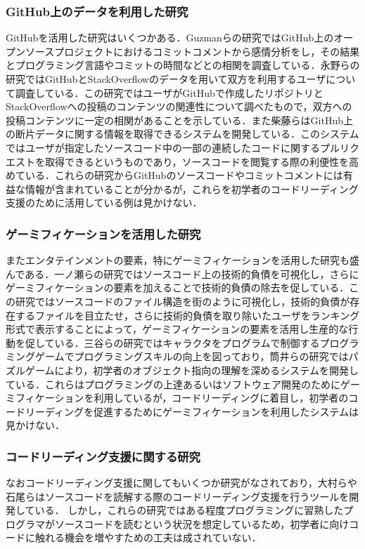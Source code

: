 \subsubsection{GitHub上のデータを利用した研究}
GitHubを活用した研究はいくつかある．Guzmanらの研究ではGitHub上のオープンソースプロジェクトにおけるコミットコメントから感情分析をし，その結果とプログラミング言語やコミットの時間などとの相関を調査している\cite{guzman}．永野らの研究ではGitHubとStackOverflowのデータを用いて双方を利用するユーザについて調査している\cite{nagano}．この研究ではユーザがGitHubで作成したリポジトリとStackOverflowへの投稿のコンテンツの関連性について調べたもので，双方への投稿コンテンツに一定の相関があることを示している．また柴藤らはGitHub上の断片データに関する情報を取得できるシステムを開発している\cite{shibatou}．このシステムではユーザが指定したソースコード中の一部の連続したコードに関するプルリクエストを取得できるというものであり，ソースコードを閲覧する際の利便性を高めている．これらの研究からGitHubのソースコードやコミットコメントには有益な情報が含まれていることが分かるが，これらを初学者のコードリーディング支援のために活用している例は見かけない．

\subsubsection{ゲーミフィケーションを活用した研究}
またエンタテインメントの要素，特にゲーミフィケーションを活用した研究も盛んである．一ノ瀬らの研究\cite{ichinose}ではソースコード上の技術的負債を可視化し，さらにゲーミフィケーションの要素を加えることで技術的負債の除去を促している．この研究ではソースコードのファイル構造を街のように可視化し，技術的負債が存在するファイルを目立たせ，さらに技術的負債を取り除いたユーザをランキング形式で表示することによって，ゲーミフィケーションの要素を活用し生産的な行動を促している．三谷らの研究\cite{mitani}ではキャラクタをプログラムで制御するプログラミングゲームでプログラミングスキルの向上を図っており，筒井らの研究\cite{tsutsui}ではパズルゲームにより，初学者のオブジェクト指向の理解を深めるシステムを開発している．これらはプログラミングの上達あるいはソフトウェア開発のためにゲーミフィケーションを利用しているが，コードリーディングに着目し，初学者のコードリーディングを促進するためにゲーミフィケーションを利用したシステムは見かけない．

\subsubsection{コードリーディング支援に関する研究}
なおコードリーディング支援に関してもいくつか研究がなされており，大村らや石尾らはソースコードを読解する際のコードリーディング支援を行うツールを開発している\cite{omura}\cite{ishio}．
しかし，これらの研究ではある程度プログラミングに習熟したプログラマがソースコードを読むという状況を想定しているため，初学者に向けコードに触れる機会を増やすための工夫は成されていない．
